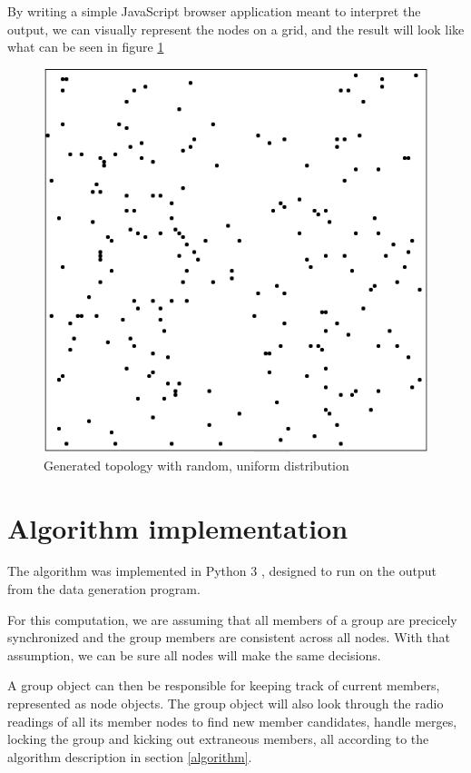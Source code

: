 By writing a simple JavaScript browser application meant to interpret the output, we can
visually represent the nodes on a grid, and the result will look like what can be seen in figure \ref{fig:randtop}

\begin{figure}
\center
\includegraphics[scale=0.4]{Images/randomtopology.png}
\caption{Generated topology with random, uniform distribution}
\label{fig:randtop}
\end{figure}

\section{Algorithm implementation}
The algorithm was implemented in Python 3 \cite{Python3}, designed to run on the output from 
the data generation program.

For this computation, we are assuming that all members of a group are precicely synchronized
and the group members are consistent across all nodes. With that assumption, we can be sure
all nodes will make the same decisions. 

A group object can then be responsible for keeping track of current members,
  represented as node objects. The group object will also look through the radio readings
  of all its member nodes to find new member candidates, handle merges, locking the group and
  kicking out extraneous members, all according to the algorithm description in section
  \ref{algorithm}.


